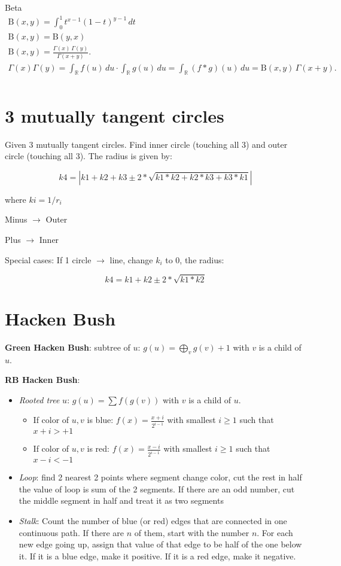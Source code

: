 \documentclass[11pt]{article}
\begin{document}
\begin{multicols}{3}
Beta
\begin{gather*}
 \mathrm {B} (x,y)=\int _{0}^{1}t^{x-1}(1-t)^{y-1}\,dt\\
 \mathrm {B} (x,y)=\mathrm {B} (y,x)\\
 \mathrm {B} (x,y)={\frac {\Gamma (x)\,\Gamma (y)}{\Gamma (x+y)}}.\\
 \Gamma (x)\Gamma (y)=\int _{\mathbb {R} }f(u)\,du\cdot \int _{\mathbb {R} }g(u)\,du=\int _{\mathbb {R} }(f*g)(u)\,du=\mathrm {B} (x,y)\,\Gamma (x+y).\\
\end{gather*}

\section{3 mutually tangent circles}

Given 3 mutually tangent circles. Find inner circle (touching all 3) and outer circle (touching all 3).
The radius is given by:

$$k4 = |k1 + k2 + k3 \pm 2*\sqrt{k1*k2 + k2*k3 + k3*k1}|$$

where $ki = 1/r_i$

Minus $\rightarrow$ Outer

Plus $\rightarrow$ Inner

Special cases: If 1 circle $\rightarrow$ line, change $k_i$ to 0, the radius:

$$k4 = k1 + k2 \pm 2*\sqrt{k1*k2}$$

\section{Hacken Bush}

\textbf{Green Hacken Bush}: subtree of $u$: $g(u) = \bigoplus_v {g(v)} + 1$ with $v$ is a child of $u$.

\textbf{RB Hacken Bush}:
\begin{itemize}
    \item \textit{Rooted tree} $u$: $g(u) = \sum{f(g(v))}$ with $v$ is a child of $u$.
    \begin{itemize}
        \item If color of ${u, v}$ is blue: $f(x) =  \frac{x + i}{2^{i-1}}$ with smallest $i \geq 1$ such that $x + i > +1$
        \item If color of ${u, v}$ is red:  $f(x) =  \frac{x - i}{2^{i-1}}$ with smallest $i \geq 1$ such that $x - i < -1$
    \end{itemize}
    \item \textit{Loop}: find 2 nearest 2 points where segment change color, cut the rest in half
the value of loop is sum of the 2 segments. If there are an odd number, cut the middle segment
in half and treat it as two segments 
    \item \textit{Stalk}: Count the number of blue (or red) edges that are connected in one continuous path.
If there are $n$ of them, start with the number $n$. For each new edge going up, assign that value 
of that edge to be half of the one below it.  If it is a blue edge, make it positive.
If it is a red edge, make it negative.
\end{itemize}


\end{multicols}
\end{document}
